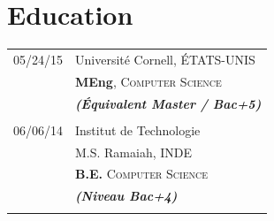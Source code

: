 \documentclass[10pt]{article} %
\begin{document}
\begin{minipage}[t]{0.49\textwidth} %


\section{Education}

\begin{tabular}{rl} %


05/24/15 & \large{Université Cornell,} \normalsize{ÉTATS-UNIS}\\
& \textbf{MEng}, \textsc{Computer Science} \\
& \hspace{1em}\textbf{\textit{(Équivalent Master / Bac+5)}} \\
&\\


06/06/14 & \large{Institut de Technologie} \\
& \large{M.S. Ramaiah,} \normalsize{INDE} \\
&  \textbf{B.E.} \textsc{Computer Science} \\
& \hspace{1em}\textbf{\textit{(Niveau Bac+4)}} \\
&\\
\end{tabular}\\[10pt]

\end{minipage} %
\end{document}
